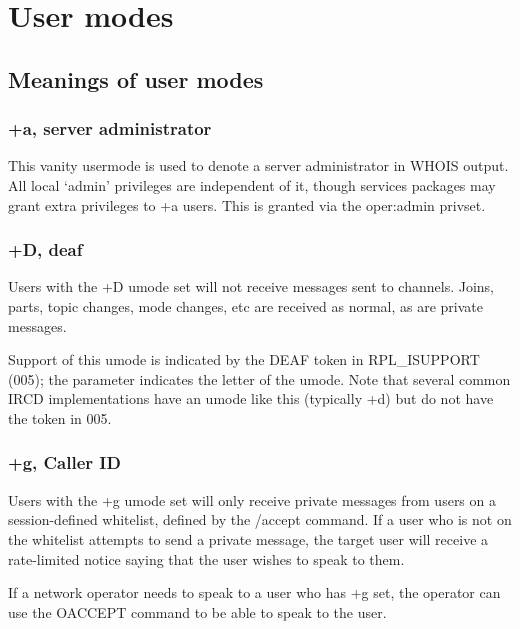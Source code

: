 \chapter{User modes}
\label{umodes}

\section{Meanings of user modes}
\label{umodelist}

\subsection{+a, server administrator}

	This vanity usermode is used to denote a server administrator in WHOIS
	output. All local `admin' privileges are independent of it, though
	services packages may grant extra privileges to +a users. This is
	granted via the oper:admin privset.


\subsection{+D, deaf}

	Users with the +D umode set will not receive messages sent to channels.
	Joins, parts, topic changes, mode changes, etc are received as normal,
	as are private messages.
 

	Support of this umode is indicated by the DEAF token in
	RPL\_ISUPPORT (005); the parameter indicates the letter
	of the umode. Note that several common IRCD implementations have
	an umode like this (typically +d) but do not have the token in 005.


\subsection{+g, Caller ID}

	Users with the +g umode set will only receive private messages from
	users on a session-{}defined whitelist, defined by the /accept command.
	If a user who is not on the whitelist attempts to send a private
	message, the target user will receive a rate-{}limited notice saying
	that the user wishes to speak to them.
 

	If a network operator needs to speak to a user who has +g set, the
	operator can use the OACCEPT command to be able to speak to the user.
 

